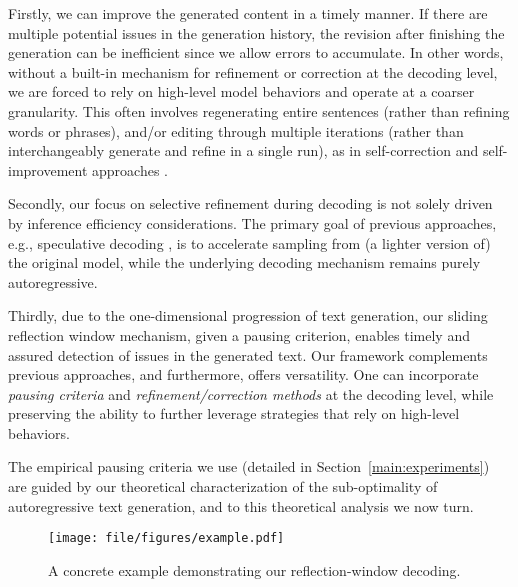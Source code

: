 Firstly, we can improve the generated content in a timely manner.
If there are multiple potential issues in the generation history, the revision after finishing the generation can be inefficient since we allow errors to accumulate.
In other words, without a built-in mechanism for refinement or correction at the decoding level, we are forced to rely on high-level model behaviors and operate at a coarser granularity.
This often involves regenerating entire sentences (rather than refining words or phrases), and/or editing through multiple iterations (rather than interchangeably generate and refine in a single run), as in self-correction and self-improvement approaches \citep{yao2022react,bai2022constitutional,pan2023automatically,shinn2023reflexion,ganguli2023capacity,chen2023teaching,kim2023language,tyen2023llms,madaan2024self}.

Secondly, our focus on selective refinement during decoding is not solely driven by inference efficiency considerations.
The primary goal of previous approaches, e.g., speculative decoding \citep{leviathan2023fast,chen2023accelerating,xia2023speculative,kim2024speculative,sun2024spectr,xia2024unlocking}, is to accelerate sampling from (a lighter version of) the original model, while the underlying decoding mechanism remains purely autoregressive.

Thirdly, due to the one-dimensional progression of text generation, our sliding reflection window mechanism, given a pausing criterion, enables timely and assured detection of issues in the generated text.
Our framework complements previous approaches, and furthermore, offers versatility.
One can incorporate \emph{pausing criteria} and \emph{refinement/correction methods} at the decoding level, while preserving the ability to further leverage strategies that rely on high-level behaviors.

The empirical pausing criteria we use (detailed in Section~\ref{main:experiments}) are guided by our theoretical characterization of the sub-optimality of autoregressive text generation, and to this theoretical analysis we now turn.

\begin{figure*}[t]
    \centering
    \texttt{[image: file/figures/example.pdf]}
    \caption{%
        A concrete example demonstrating our reflection-window decoding.
    }
    \label{fig:example}
\end{figure*}

